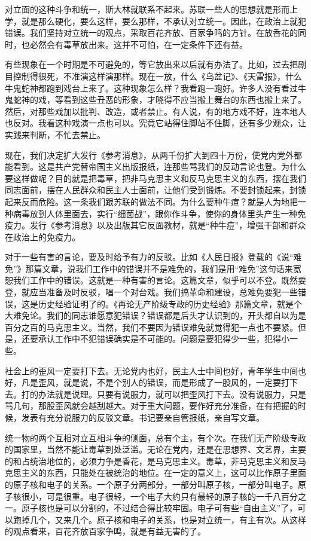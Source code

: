 对立面的这种斗争和统一，斯大林就联系不起来。苏联一些人的思想就是形而上学，就是那么硬化，要么这样，要么那样，不承认对立统一。因此，在政治上就犯错误。我们坚持对立统一的观点，采取百花齐放、百家争鸣的方针。在放香花的同时，也必然会有毒草放出来。这并不可怕，在一定条件下还有益。

有些现象在一个时期是不可避免的，等它放出来以后就有办法了。比如，过去把剧目控制得很死，不准演这样演那样。现在一放，什么《乌盆记》、《天雷报》，什么牛鬼蛇神都跑到戏台上来了。这种现象怎么样？我看跑一跑好。许多人没有看过牛鬼蛇神的戏，等看到这些丑恶的形象，才晓得不应当搬上舞台的东西也搬上来了。然后，对那些戏加以批判、改造，或者禁止。有人说，有的地方戏不好，连本地人也反对。我看这种戏演一点也可以。究竟它站得住脚站不住脚，还有多少观众，让实践来判断，不忙去禁止。

现在，我们决定扩大发行《参考消息》，从两千份扩大到四十万份，使党内党外都能看到。这是共产党替帝国主义出版报纸，连那些骂我们的反动言论也登。为什么要这样做呢？目的就是把毒草，把非马克思主义和反马克思主义的东西，摆在我们同志面前，摆在人民群众和民主人士面前，让他们受到锻炼。不要封锁起来，封锁起来反而危险。这一条我们跟苏联的做法不同。为什么要种牛痘？就是人为地把一种病毒放到人体里面去，实行“细菌战”，跟你作斗争，使你的身体里头产生一种免疫力。发行《参考消息》以及出版其它反面教材，就是“种牛痘”，增强干部和群众在政治上的免疫力。

对于一些有害的言论，要及时给予有力的反驳。比如《人民日报》登载的《说“难免”》那篇文章，说我们工作中的错误并不是难免的，我们是用“难免”这句话来宽恕我们工作中的错误。这就是一种有害的言论。这篇文章，似乎可以不登。既然要登，就应当准备及时反驳，唱一个对台戏。我们搞革命和建设，总难免要犯一些错误，这是历史经验证明了的。《再论无产阶级专政的历史经验》那篇文章，就是个大难免论。我们的同志谁愿意犯错误？错误都是后头才认识到的，开头都自以为是百分之百的马克思主义。当然，我们不要因为错误难免就觉得犯一点也不要紧。但是，还要承认工作中不犯错误确实是不可能的。问题是要犯得少一些，犯得小一些。

社会上的歪风一定要打下去。无论党内也好，民主人士中间也好，青年学生中间也好，凡是歪风，就是说，不是个别人的错误，而是形成了一股风的，一定要打下去。打的办法就是说理。只要有说服力，就可以把歪风打下去。没有说服力，只是骂几句，那股歪风就会越刮越大。对于重大问题，要作好充分准备，在有把握的时候，发表有充分说服力的反驳文章。书记要亲自管报纸，亲自写文章。

统一物的两个互相对立互相斗争的侧面，总有个主，有个次。在我们无产阶级专政的国家里，当然不能让毒草到处泛滥。无论在党内，还是在思想界、文艺界，主要的和占统治地位的，必须力争是香花，是马克思主义。毒草，非马克思主义和反马克思主义的东西，只能处在被统治的地位。在一定的意义上，这可以比作原子里面的原子核和电子的关系。一个原子分两部分，一部分叫原子核，一部分叫电子。原子核很小，可是很重。电子很轻，一个电子大约只有最轻的原子核的一千八百分之一。原子核也是可以分割的，不过结合得比较牢固。电子可有些“自由主义”了，可以跑掉几个，又来几个。原子核和电子的关系，也是对立统一，有主有次。从这样的观点看来，百花齐放百家争鸣，就是有益无害的了。


